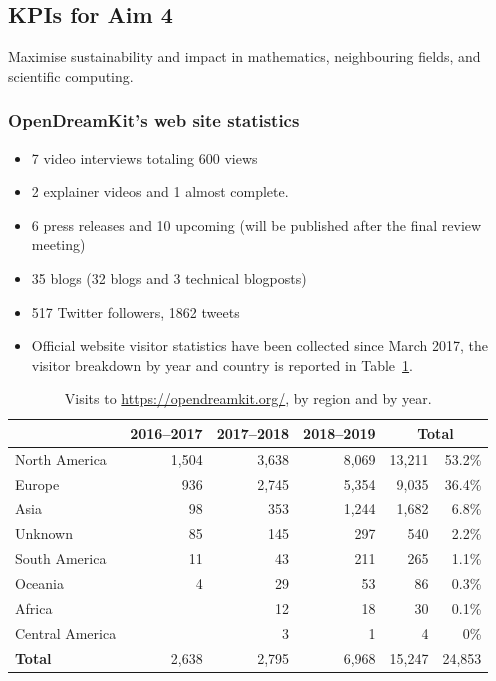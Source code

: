 \subsection{KPIs for Aim 4}

\begin{aim}
  Maximise sustainability and impact in mathematics, neighbouring
  fields, and scientific computing.
\end{aim}

\subsubsection{OpenDreamKit's web site statistics}

\begin{itemize}
\item 7 video interviews totaling 600 views %
\item 2 explainer videos and 1 almost complete.
\item 6 press releases and 10 upcoming (will be published after the final review meeting)
\item 35 blogs (32 blogs and 3 technical blogposts)
\item 517 Twitter followers, 1862 tweets
\item Official website visitor statistics have been collected since
  March 2017, the visitor breakdown by year and country is reported in
  Table~\ref{tab:byregion}.
\end{itemize}

\begin{table}[h]
  \centering
  \begin{tabular}{l r r r r r}
    & {\bf 2016--2017} & {\bf 2017--2018} & {\bf 2018--2019} & \multicolumn{2}{c}{\bf Total}\\
    \hline
    North America   & 1,504 & 3,638 & 8,069 & 13,211 & 53.2\%\\
    Europe          &   936 & 2,745 & 5,354 &  9,035 & 36.4\%\\
    Asia            &    98 &   353 & 1,244 &  1,682 &  6.8\%\\
    Unknown         &    85 &   145 &   297 &    540 &  2.2\%\\
    South America   &    11 &    43 &   211 &    265 &  1.1\%\\
    Oceania         &     4 &    29 &    53 &     86 &  0.3\%\\
    Africa          &       &    12 &    18 &     30 &  0.1\%\\
    Central America &       &     3 &     1 &      4 &  0\%\\
    \hline
    {\bf Total}  & 2,638 & 2,795 & 6,968 & 15,247 & 24,853
  \end{tabular}
  \caption{Visits to \url{https://opendreamkit.org/}, by region and by year.}
  \label{tab:byregion}
\end{table}

